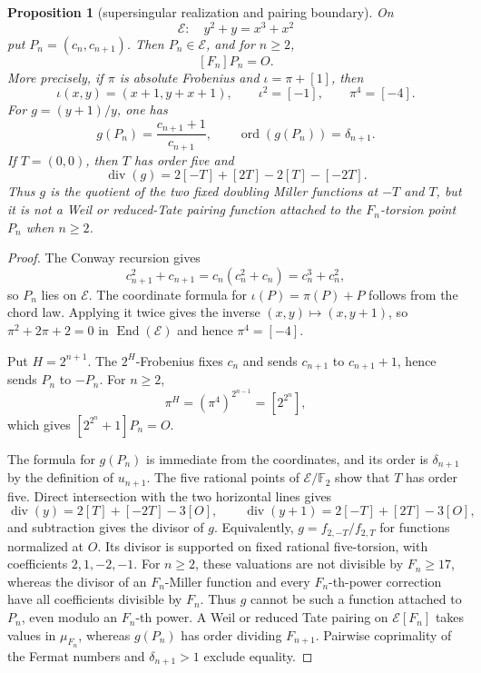 \documentclass[11pt]{article}
\newtheorem{proposition}[theorem]{Proposition}
\theoremstyle{definition}
\theoremstyle{remark}
\begin{document}
\begin{proposition}[supersingular realization and pairing boundary]
\label{prop:z-elliptic}
On
\[
 \mathcal E:\quad y^2+y=x^3+x^2
\]
put $P_n=(c_n,c_{n+1})$.  Then $P_n\in\mathcal E$, and for $n\geq2$,
\[
 [F_n]P_n=O.
\]
More precisely, if $\pi$ is absolute Frobenius and $\iota=\pi+[1]$, then
\[
 \iota(x,y)=(x+1,y+x+1),\qquad
 \iota^2=[-1],\qquad \pi^4=[-4].
\]
For $g=(y+1)/y$, one has
\[
 g(P_n)=\frac{c_{n+1}+1}{c_{n+1}},
 \qquad \operatorname{ord}(g(P_n))=\delta_{n+1}.
\]
If $T=(0,0)$, then $T$ has order five and
\[
 \operatorname{div}(g)
 =2[-T]+[2T]-2[T]-[-2T].
\]
Thus $g$ is the quotient of the two fixed doubling Miller functions at
$-T$ and $T$, but it is not a Weil or reduced-Tate pairing function attached
to the $F_n$-torsion point $P_n$ when $n\geq2$.
\end{proposition}

\begin{proof}
The Conway recursion gives
\[
 c_{n+1}^2+c_{n+1}
 =c_n(c_n^2+c_n)=c_n^3+c_n^2,
\]
so $P_n$ lies on $\mathcal E$.  The coordinate formula for
$\iota(P)=\pi(P)+P$ follows from the chord law.  Applying it twice gives the
inverse $(x,y)\mapsto(x,y+1)$, so
$\pi^2+2\pi+2=0$ in $\operatorname{End}(\mathcal E)$ and hence
$\pi^4=[-4]$.

Put $H=2^{n+1}$.  The $2^H$-Frobenius fixes $c_n$ and sends $c_{n+1}$ to
$c_{n+1}+1$, hence sends $P_n$ to $-P_n$.  For $n\geq2$,
\[
 \pi^H=(\pi^4)^{2^{n-1}}=[2^{2^n}],
\]
which gives $[2^{2^n}+1]P_n=O$.

The formula for $g(P_n)$ is immediate from the coordinates, and its order is
$\delta_{n+1}$ by the definition of $u_{n+1}$.  The five rational points of
$\mathcal E/\mathbb F_2$ show that $T$ has order five.  Direct intersection
with the two horizontal lines gives
\[
 \operatorname{div}(y)=2[T]+[-2T]-3[O],\qquad
 \operatorname{div}(y+1)=2[-T]+[2T]-3[O],
\]
and subtraction gives the divisor of $g$.  Equivalently,
$g=f_{2,-T}/f_{2,T}$ for functions normalized at $O$.  Its divisor is
supported on fixed rational five-torsion, with coefficients $2,1,-2,-1$.
For $n\geq2$, these valuations are not divisible by $F_n\geq17$, whereas the
divisor of an $F_n$-Miller function and every $F_n$-th-power correction have
all coefficients divisible by $F_n$.  Thus $g$ cannot be such a function
attached to $P_n$, even modulo an $F_n$-th power.
A Weil or reduced Tate pairing on $\mathcal E[F_n]$ takes values in
$\mu_{F_n}$, whereas $g(P_n)$ has order dividing $F_{n+1}$.  Pairwise
coprimality of the Fermat numbers and $\delta_{n+1}>1$ exclude equality.
\end{proof}
\end{document}

